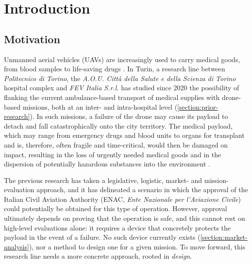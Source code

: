 \chapter{Introduction}
\label{chapter:introduction}


\section{Motivation}\label{section:motivation}
Unmanned aerial vehicles (UAVs) are increasingly used to carry medical goods, from blood samples to life-saving drugs \cite{Balasingam2017, chhetri2026survey}. In Turin, a research line between \textit{Politecnico di Torino}, the \textit{A.O.U. Città della Salute e della Scienza di Torino} hospital complex and \textit{FEV Italia S.r.l.} has studied since 2020 the possibility of flanking the current ambulance-based transport of medical supplies with drone-based missions, both at an inter- and intra-hospital level (\cref{section:prior-research}). In such missions, a failure of the drone may cause its payload to detach and fall catastrophically onto the city territory. The medical payload, which may range from emergency drugs and blood units to organs for transplant and is, therefore, often fragile and time-critical, would then be damaged on impact, resulting in the loss of urgently needed medical goods and in the dispersion of potentially hazardous substances into the environment \cite{EU_2019_947, EASA_AMC_947}.

The previous research has taken a legislative, logistic, market- and mission-evaluation approach, and it has delineated a scenario in which the approval of the Italian Civil Aviation Authority (ENAC, \textit{Ente Nazionale per l'Aviazione Civile}) could potentially be obtained for this type of operation. However, approval ultimately depends on proving that the operation is safe, and this cannot rest on high-level evaluations alone: it requires a device that concretely protects the payload in the event of a failure. No such device currently exists (\cref{section:market-analysis}), nor a method to design one for a given mission. To move forward, this research line needs a more concrete approach, rooted in \textit{design}.

